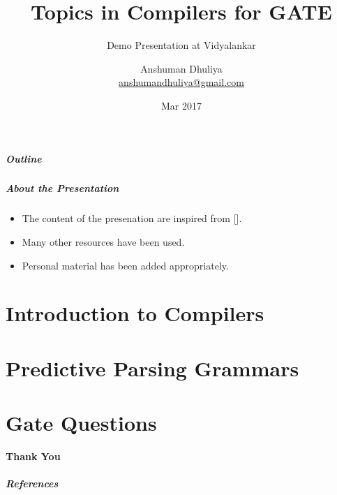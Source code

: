 \documentclass{beamer}
\title[Compilers]{Topics in Compilers for GATE}
\subtitle{Demo Presentation at Vidyalankar}
\author[Anshuman Dhuliya]{
    Anshuman Dhuliya \\
  {\small \url{anshumandhuliya@gmail.com}} }
\institute[Vidyalankar]{
    PhD Scholar At \\
  Indian Institute of Technology Bombay}
\date[Demo PPT Mar 2017]{
  Mar 2017}
\begin{document}
\begin{frame}
    \titlepage
\end{frame}


\begin{frame}
    \frametitle{Outline}
    \tableofcontents[onlyparts]
\end{frame}


\begin{frame}
    \frametitle{About the Presentation}
    \begin{itemize}
        \item The content of the presenation are inspired from [].
        \item Many other resources have been used.
        \item Personal material has been added appropriately.
    \end{itemize}

\end{frame}

\part{Introduction to Compilers}
\frame[plain]{
    \partpage
}


\part{Predictive Parsing Grammars}
\frame[plain]{
    \partpage
}


\part{Gate Questions}
\frame[plain]{
    \partpage
}


\begin{frame}[plain]
    \begin{center}
        \textbf{\Huge{}Thank You}
    \end{center}
\end{frame}


\begin{frame}[t,allowframebreaks]
        \frametitle{References}
        \printbibliography
\end{frame}
\end{document}
